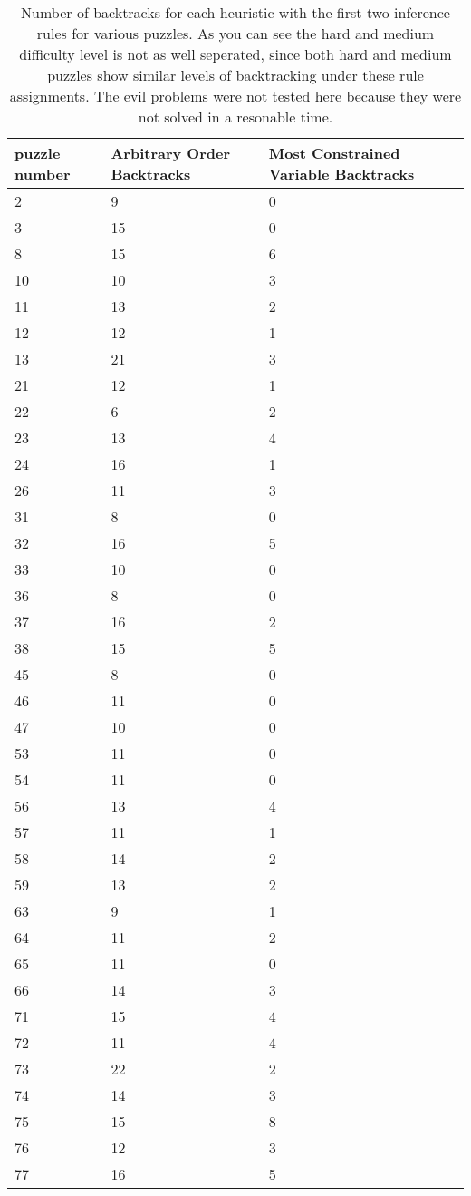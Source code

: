 \documentclass{article}
\begin{document}
\begin{table}[h]
  \centering
  \begin{tabular}{lll}
   \toprule
    puzzle number& Arbitrary Order Backtracks & Most Constrained Variable Backtracks\\
    \midrule
    2&9&0\\
    \midrule
    3&15&0\\
    \midrule
    8&15&6\\
    \midrule
    10&10&3\\
    \midrule
    11&13&2\\
    \midrule
    12&12&1\\
    \midrule
    13&21&3\\
    \midrule
    21&12&1\\
    \midrule
    22&6&2\\
    \midrule
    23&13&4\\
    \midrule
    24&16&1\\
    \midrule
    26&11&3\\
    \midrule
    31&8&0\\
    \midrule
    32&16&5\\
    \midrule
    33&10&0\\
    \midrule
    36&8&0\\
    \midrule
    37&16&2\\
    \midrule
    38&15&5\\
    \midrule
    45&8&0\\
    \midrule
    46&11&0\\
    \midrule
    47&10&0\\
    \midrule
    53&11&0\\
    \midrule
    54&11&0\\
    \midrule
    56&13&4\\
    \midrule
    57&11&1\\
    \midrule
    58&14&2\\
    \midrule
    59&13&2\\
    \midrule
    63&9&1\\
    \midrule
    64&11&2\\
    \midrule
    65&11&0\\
    \midrule
    66&14&3\\
    \midrule
    71&15&4\\
    \midrule
    72&11&4\\
    \midrule
    73&22&2\\
    \midrule
    74&14&3\\
    \midrule
    75&15&8\\
    \midrule
    76&12&3\\
    \midrule
    77&16&5\\
           \bottomrule
  \end{tabular}
  \caption{Number of backtracks for each heuristic with the first two inference rules for various puzzles. As you can see the hard and medium difficulty level is not as well seperated, since both hard and medium puzzles show similar levels of backtracking under these rule assignments. The evil problems were not tested here because they were not solved in a resonable time.  }
  \label{tab:firstInferences}
\end{table}
\end{document}

